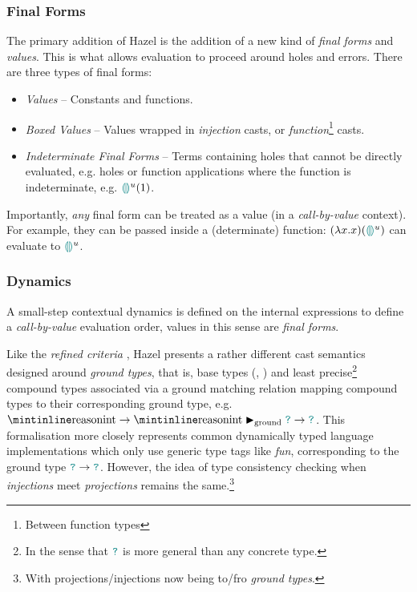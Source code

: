 \subsubsection{Final Forms}\label{sec:HazelFinalForms}
The primary addition of Hazel is the addition of a new kind of \textit{final forms} and \textit{values}. This is what allows evaluation to proceed around holes and errors. There are three types of final forms:
\begin{itemize}
\item \textit{Values} -- Constants and functions.
\item \textit{Boxed Values} -- Values wrapped in \textit{injection} casts, or \textit{function}\footnote{Between function types} casts.
\item \textit{Indeterminate Final Forms} -- Terms containing holes that cannot be directly evaluated, e.g. holes or function applications where the function is indeterminate, e.g. ${\color{teal}\llparenthesis}  {\color{teal}\rrparenthesis}^u(1)$.
\end{itemize}
 Importantly, \textit{any} final form can be treated as a value (in a \textit{call-by-value} context). For example, they can be passed inside a (determinate) function: $(\lambda x. x)({\color{teal}\llparenthesis}  {\color{teal}\rrparenthesis}^u)$ can evaluate to ${\color{teal}\llparenthesis}  {\color{teal}\rrparenthesis}^u$.

\subsubsection{Dynamics}\label{sec:HazelDynamics}
A small-step contextual dynamics \cite[ch. 5]{PracticalFoundations} is defined on the internal expressions to define a \textit{call-by-value} evaluation order, values in this sense are \textit{final forms}. 

Like the \textit{refined criteria}  \cite{GradualRefined}, Hazel presents a rather different cast semantics designed around \textit{ground types}, that is, base types (, ) and least precise\footnote{In the sense that ${\color{teal}\texttt{?}}$ is more general than any concrete type.} compound types associated via a ground matching relation mapping compound types to their corresponding ground type, e.g. $\code{int} \to \code{int} \groundmatch \dyn \to \dyn$. This formalisation more closely represents common dynamically typed language implementations which only use generic type tags like \textit{fun}, corresponding to the ground type ${\color{teal}\texttt{?}} \to {\color{teal}\texttt{?}}$. However, the idea of type consistency checking when \textit{injections} meet \textit{projections} remains the same.\footnote{With projections/injections now being to/fro \textit{ground types}.} 

